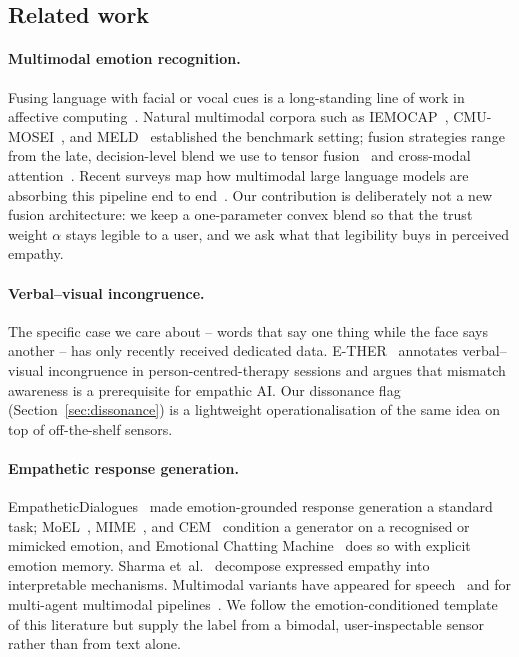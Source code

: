\documentclass[sigconf,nonacm]{acmart}
\begin{document}
  \subsection{Related work}
  \paragraph{Multimodal emotion recognition.} Fusing language with facial or vocal cues is a long-standing line of work in affective computing~\cite{picard1997affective,baltrusaitis2019multimodal}. Natural multimodal corpora such as IEMOCAP~\cite{busso2008iemocap}, CMU-MOSEI~\cite{zadeh2018mosei}, and MELD~\cite{poria2019meld} established the benchmark setting; fusion strategies range from the late, decision-level blend we use to tensor fusion~\cite{zadeh2017tensor} and cross-modal attention~\cite{tsai2019mult}. Recent surveys map how multimodal large language models are absorbing this pipeline end to end~\cite{zhang2026mer_llm_survey}. Our contribution is deliberately not a new fusion architecture: we keep a one-parameter convex blend so that the trust weight $\alpha$ stays legible to a user, and we ask what that legibility buys in perceived empathy.

  \paragraph{Verbal--visual incongruence.} The specific case we care about -- words that say one thing while the face says another -- has only recently received dedicated data. E-THER~\cite{tahir2025ether} annotates verbal--visual incongruence in person-centred-therapy sessions and argues that mismatch awareness is a prerequisite for empathic AI. Our dissonance flag (Section~\ref{sec:dissonance}) is a lightweight operationalisation of the same idea on top of off-the-shelf sensors.

  \paragraph{Empathetic response generation.} EmpatheticDialogues~\cite{rashkin2019empathetic} made emotion-grounded response generation a standard task; MoEL~\cite{lin2019moel}, MIME~\cite{majumder2020mime}, and CEM~\cite{sabour2022cem} condition a generator on a recognised or mimicked emotion, and Emotional Chatting Machine~\cite{zhou2018ecm} does so with explicit emotion memory. Sharma et~al.~\cite{sharma2020epitome} decompose expressed empathy into interpretable mechanisms. Multimodal variants have appeared for speech~\cite{wang2024blspemo} and for multi-agent multimodal pipelines~\cite{wang2026multiagent_merg}. We follow the emotion-conditioned template of this literature but supply the label from a bimodal, user-inspectable sensor rather than from text alone.
\end{document}
